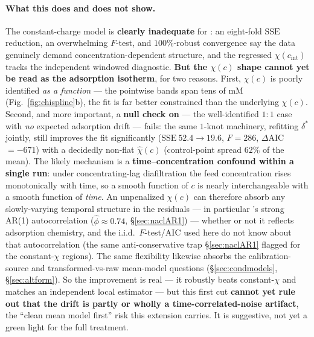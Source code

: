 \documentclass[11pt]{article}
\newcommand{\dstar}{\delta^{*}}
\newcommand{\cint}{c_{\mathrm{int}}}
\newcommand{\SSE}{\mathrm{SSE}}
\begin{document}
\paragraph{What this does and does not show.} The constant-charge model is
\textbf{clearly inadequate} for : an eight-fold $\SSE$ reduction, an
overwhelming $F$-test, and $100\%$-robust convergence say the data genuinely
demand concentration-dependent structure, and the regressed $\chi(\cint)$ tracks
the independent windowed diagnostic. \textbf{But the $\chi(c)$ shape cannot yet
be read as the adsorption isotherm}, for two reasons. First, $\chi(c)$ is poorly
identified \emph{as a function} --- the pointwise bands span tens of mM
(Fig.~\ref{fig:chispline}b), the fit is far better constrained than the
underlying $\chi(c)$. Second, and more important, a \textbf{null check on
} --- the well-identified $1{:}1$ case with \emph{no} expected
adsorption drift --- fails: the same $1$-knot machinery, refitting $\dstar$
jointly, still improves the  fit significantly ($\SSE\ 52.4\to19.6$,
$F=286$, $\Delta$AIC $=-671$) with a decidedly non-flat $\hat\chi(c)$
(control-point spread $62\%$ of the mean). The likely mechanism is a
\textbf{time--concentration confound within a single run}: under
concentrating-lag diafiltration the feed concentration rises monotonically with
time, so a smooth function of $c$ is nearly interchangeable with a smooth
function of \emph{time}. An unpenalized $\chi(c)$ can therefore absorb any
slowly-varying temporal structure in the residuals --- in particular 's
strong AR(1) autocorrelation ($\hat\phi\approx0.74$, \S\ref{sec:naclAR1}) ---
whether or not it reflects adsorption chemistry, and the i.i.d.\ $F$-test/AIC
used here do not know about that autocorrelation (the same anti-conservative
trap \S\ref{sec:naclAR1} flagged for the constant-$\chi$ regions). The same
flexibility likewise absorbs the calibration-source and transformed-vs-raw
mean-model questions (\S\ref{sec:condmodels}, \S\ref{sec:altform}). So the
 improvement is real --- it robustly beats constant-$\chi$ and matches
an independent local estimator --- but this first cut \textbf{cannot yet rule
out that the drift is partly or wholly a time-correlated-noise artifact}, the
``clean mean model first'' risk this extension carries. It is suggestive, not
yet a green light for the full treatment.
\end{document}
